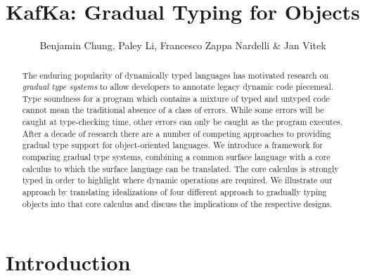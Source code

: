 \documentclass[USenglish]{tex/lipics-v2016}f
\begin{document}
\title{KafKa: Gradual Typing for Objects}
\author{Benjamin Chung, Paley Li, Francesco Zappa Nardelli \& Jan Vitek}


\EventLogo{}


\maketitle

\begin{abstract} 
The enduring popularity of dynamically typed languages has motivated
research on \emph{gradual type systems} to allow developers to annotate
legacy dynamic code piecemeal. Type soundness for a program which contains a
mixture of typed and untyped code cannot mean the traditional absence of a class of
errors. While some errors will be caught at type-checking time, other errors
can only be caught as the program executes. After a decade of research
there are a number of competing approaches to providing gradual type
support for object-oriented languages. We introduce a framework for
comparing gradual type systems, combining a common surface language with
a core calculus to which the surface language can be translated. 
The core calculus  is strongly typed in order to highlight where dynamic
operations are required.  We illustrate our approach by translating
idealizations of four different approach to gradually typing objects into that core
calculus and discuss the implications of the respective designs.
\end{abstract}

\section{Introduction}
\end{document}
